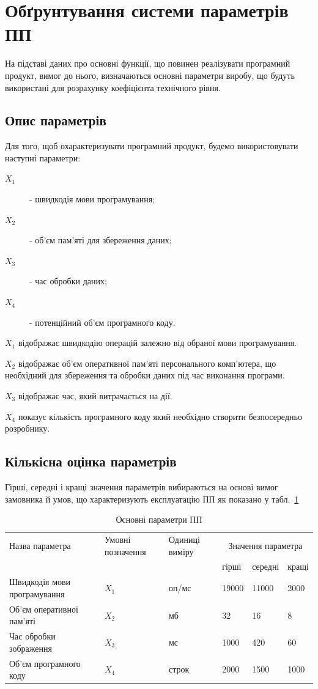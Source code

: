 \section{Обґрунтування системи параметрів ПП}
На підставі даних про основні функції, що повинен реалізувати програмний продукт, вимог до нього, визначаються основні параметри виробу, що будуть використані для розрахунку коефіцієнта технічного рівня.

\subsection{Опис параметрів}

Для того, щоб охарактеризувати програмний продукт, будемо використовувати наступні параметри:
\begin{description}
	\item[$X_1$] - швидкодія мови програмування;
	\item[$X_2$] - об’єм пам’яті для збереження даних;
	\item[$X_3$] - час обробки даних;
	\item[$X_4$] - потенційний об’єм програмного коду.
\end{description}

$X_1$ відображає швидкодію операцій залежно від обраної мови програмування. 

$X_2$ відображає об'єм оперативної пам'яті персонального комп'ютера, що необхідний для збереження та обробки даних під час виконання програми.

$X_3$ відображає час, який витрачається на дії.

$X_4$ показує кількість програмного коду який необхідно створити безпосередньо розробнику. 

\subsection{Кількісна оцінка параметрів}
Гірші, середні і кращі значення параметрів вибираються на основі вимог замовника й умов, що характеризують експлуатацію ПП як показано у табл.~\ref*{tab:economics_program_parameters}

\begin{table}[ht]
	\caption{Основні параметри ПП}
	\centering
\begin{tabular}{|p{}|p{}|p{}|p{}|p{}|p{}|}
	\hline
	Назва параметра & Умовні позначення & Одиниці виміру & \multicolumn{3}{c|}{Значення параметра} \\ \cline{4-6}
	& & & гірші & середні & кращі \\
	\hline	
	Швидкодія мови програмування & $X_1$ & оп/мс & 19000 & 11000 & 2000 \\ 
	\hline
	Об'єм оперативної пам'яті & $X_2$ & мб & 32 & 16 & 8 \\
	\hline
	Час обробки зображення & $X_3$ & мс & 1000 & 420 & 60  \\
	\hline
	Об'єм програмного коду & $X_4$ & строк & 2000 &1500& 1000 \\
	\hline
\end{tabular}		
	\label{tab:economics_program_parameters}
\end{table}

